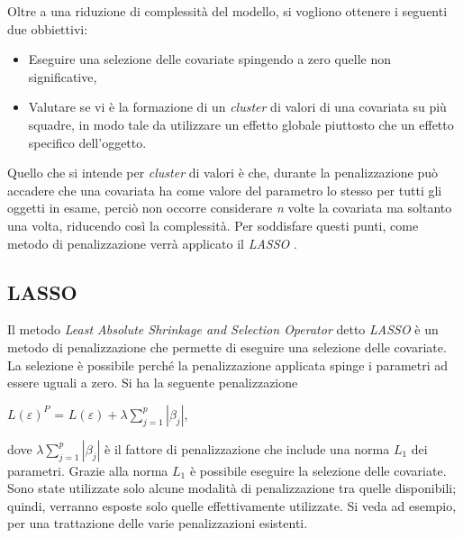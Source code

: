 Oltre a una riduzione di complessità del modello, si vogliono ottenere i seguenti due obbiettivi:
\begin{itemize}
	\item Eseguire una selezione delle covariate spingendo a zero quelle non significative,
	\item Valutare se vi è la formazione di un \emph{cluster} di valori di una covariata su più squadre, in modo tale da utilizzare un effetto globale piuttosto che un effetto specifico dell'oggetto. 
\end{itemize}
Quello che si intende per \emph{cluster} di valori è che, durante la penalizzazione può accadere che una covariata ha come valore del parametro lo stesso per tutti gli oggetti in esame, perciò non occorre considerare \emph{n} volte la covariata ma soltanto una volta, riducendo così la complessità.
Per soddisfare questi punti, come metodo di penalizzazione verrà applicato il \emph{LASSO} \autocite{tibshirani1996regression}.\\
\subsection{LASSO}
Il metodo \emph{Least Absolute Shrinkage and Selection Operator} detto \emph{LASSO} \autocite{tibshirani1996regression} è un metodo di penalizzazione che permette di eseguire una selezione delle covariate. La selezione è possibile perché la penalizzazione applicata spinge i parametri ad essere uguali a zero. Si ha la seguente penalizzazione

\begin{center}
	$L(\varepsilon)^{P}$ = $L(\varepsilon) + \lambda\sum_{j=1}^{p}|\beta_{j}|$,
\end{center}

dove $\lambda\sum_{j=1}^{p}|\beta_{j}|$ è il fattore di penalizzazione che include una norma $L_1$ dei parametri. Grazie alla norma $L_1$ è possibile eseguire la selezione delle covariate.\\
Sono state utilizzate solo alcune modalità di penalizzazione tra quelle disponibili; quindi, verranno esposte solo quelle effettivamente utilizzate. Si veda ad esempio, \textcite{schauberger2019btllasso} per una trattazione delle varie penalizzazioni esistenti.\\

